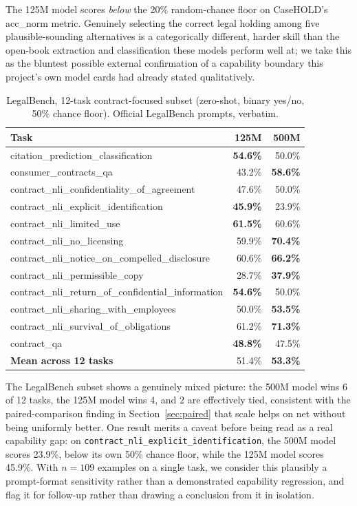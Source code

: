 \documentclass[11pt]{article}
\begin{document}
The 125M model scores \emph{below} the 20\% random-chance floor on
CaseHOLD's acc\_norm metric. Genuinely selecting the correct legal
holding among five plausible-sounding alternatives is a categorically
different, harder skill than the open-book extraction and classification
these models perform well at; we take this as the bluntest possible
external confirmation of a capability boundary this project's own
model cards had already stated qualitatively.

\begin{table}[h]
\centering
\caption{LegalBench, 12-task contract-focused subset (zero-shot,
binary yes/no, 50\% chance floor). Official LegalBench prompts, verbatim.}
\label{tab:legalbench}
\small
\begin{tabular}{lrr}
\toprule
\textbf{Task} & \textbf{125M} & \textbf{500M} \\
\midrule
citation\_prediction\_classification & \textbf{54.6\%} & 50.0\% \\
consumer\_contracts\_qa & 43.2\% & \textbf{58.6\%} \\
contract\_nli\_confidentiality\_of\_agreement & 47.6\% & 50.0\% \\
contract\_nli\_explicit\_identification & \textbf{45.9\%} & 23.9\% \\
contract\_nli\_limited\_use & \textbf{61.5\%} & 60.6\% \\
contract\_nli\_no\_licensing & 59.9\% & \textbf{70.4\%} \\
contract\_nli\_notice\_on\_compelled\_disclosure & 60.6\% & \textbf{66.2\%} \\
contract\_nli\_permissible\_copy & 28.7\% & \textbf{37.9\%} \\
contract\_nli\_return\_of\_confidential\_information & \textbf{54.6\%} & 50.0\% \\
contract\_nli\_sharing\_with\_employees & 50.0\% & \textbf{53.5\%} \\
contract\_nli\_survival\_of\_obligations & 61.2\% & \textbf{71.3\%} \\
contract\_qa & \textbf{48.8\%} & 47.5\% \\
\midrule
\textbf{Mean across 12 tasks} & 51.4\% & \textbf{53.3\%} \\
\bottomrule
\end{tabular}
\end{table}

The LegalBench subset shows a genuinely mixed picture: the 500M model
wins 6 of 12 tasks, the 125M model wins 4, and 2 are effectively tied,
consistent with the paired-comparison finding in
Section~\ref{sec:paired} that scale helps on net without being uniformly
better. One result merits a caveat before being read as a real capability
gap: on \texttt{contract\_nli\_explicit\_identification}, the 500M model
scores 23.9\%, below its own 50\% chance floor, while the 125M model
scores 45.9\%. With $n=109$ examples on a single task, we consider this
plausibly a prompt-format sensitivity rather than a demonstrated
capability regression, and flag it for follow-up rather than drawing a
conclusion from it in isolation.
\end{document}
